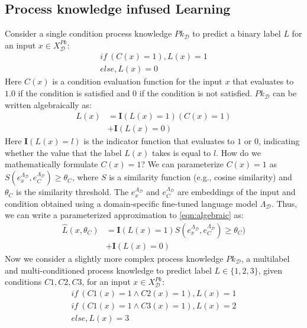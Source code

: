 \documentclass[letterpaper]{article} %
\begin{document}
\subsection{Process knowledge infused Learning}
Consider a single condition process knowledge $Pk_{\mathcal{D}}$ to predict a binary label $L$ for an input $x \in X^{Pk}_{\mathcal{D}}$:
\begin{align*}
    if~(C(x)=1), L(x)=1 \\
    else, L(x)=0
\end{align*}
Here $C(x)$ is a condition evaluation function for the input $x$ that evaluates to $1.0$ if the condition is satisfied and $0$ if the condition is not satisfied. $Pk_{\mathcal{D}}$ can be written algebraically as: 
\begin{equation}\label{eqn:algebraic}
\begin{split}
L(x) &= \mathbf{I}(L(x)=1)(C(x)=1) \\
&+ \mathbf{I}(L(x)=0) 
\end{split}
\end{equation}Here $\mathbf{I}(L(x)=l)$ is the indicator function that evaluates to $1$ or $0$, indicating whether the value that the label $L(x)$ takes is equal to $l$. How do we mathematically formulate $C(x)=1$?
We can parameterize $C(x)=1$ as $S(e^{\Lambda_{\mathcal{D}}}_x, e^{\Lambda_{\mathcal{D}}}_C) \geq \theta_C$, where $S$ is a similarity function (e.g., cosine similarity) and $\theta_C$ is the similarity threshold. The $e^{\Lambda_{\mathcal{D}}}_x$ and $e^{\Lambda_{\mathcal{D}}}_C$ are embeddings of the input and condition obtained using a domain-specific fine-tuned language model $\Lambda_{\mathcal{D}}$. Thus, we can write a parameterized approximation to \eqref{eqn:algebraic} as:
\begin{equation}\label{eqn:sim}
\begin{split}
\hat{L}(x,\theta_C) &= \mathbf{I}(L(x)=1)S(e^{\Lambda_{\mathcal{D}}}_x, e^{\Lambda_{\mathcal{D}}}_C) \geq \theta_C) \\
&+ \mathbf{I}(L(x)=0)
\end{split}
\end{equation}
Now we consider a slightly more complex process knowledge $Pk_{\mathcal{D}}$, a multilabel and multi-conditioned process knowledge to predict label $L \in \{1,2,3\}$, given conditions $C1, C2, C3$, for an input $x \in X^{Pk}_{\mathcal{D}}$:
\begin{align*}
    if~(C1(x)=1 \land C2(x) = 1), L(x) = 1 \\
    if~(C1(x)=1 \land C3(x) = 1), L(x) = 2 \\
    else, L(x) = 3
\end{align*}
\end{document}
